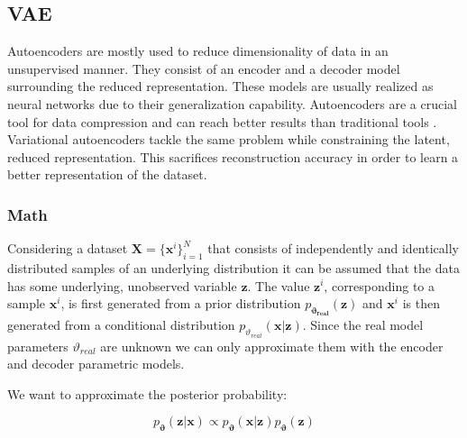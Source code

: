 \documentclass[11pt, english]{article}
\begin{document}
\subsection{VAE}

\par Autoencoders are mostly used to reduce dimensionality of data in an unsupervised manner. They consist of an encoder and a decoder model surrounding the reduced representation. These models are usually realized as neural networks due to their generalization capability. Autoencoders are a crucial tool for data compression and can reach better results than traditional tools \cite{theis2017lossy}. Variational autoencoders tackle the same problem while constraining the latent, reduced representation. This sacrifices reconstruction accuracy in order to learn a better representation of the dataset.

\subsubsection{Math}

\par Considering a dataset $\boldsymbol{X} = \big\{\boldsymbol{\bm{x}}^{i}\big\}_{i = 1}^{N}$ that consists of independently and identically distributed samples of an underlying distribution it can be assumed that the data has some underlying, unobserved variable $\boldsymbol{\bm{z}}$. The value $\boldsymbol{\bm{z}}^{i}$, corresponding to a sample $\boldsymbol{\bm{x}}^{i}$, is first generated from a prior distribution $p_{\boldsymbol{\vartheta_{real}}}(\boldsymbol{\bm{z}})$ and $\boldsymbol{\bm{x}}^{i}$ is then generated from a conditional distribution $p_{\vartheta_{real}}(\boldsymbol{\bm{x}} | \boldsymbol{\bm{z}})$. Since the real model parameters $\vartheta_{real}$ are unknown we can only approximate them with the encoder and decoder parametric models.
\par We want to approximate the posterior probability:

\vspace{3mm}

\begin{equation}
    p_{\boldsymbol{\vartheta}}(\boldsymbol{\bm{z}} | \boldsymbol{\bm{x}}) \propto p_{\boldsymbol{\vartheta}}(\boldsymbol{\bm{x}} | \boldsymbol{\bm{z}}) p_{\boldsymbol{\vartheta}}(\boldsymbol{\bm{z}})
\end{equation}

\vspace{3mm}
\end{document}
